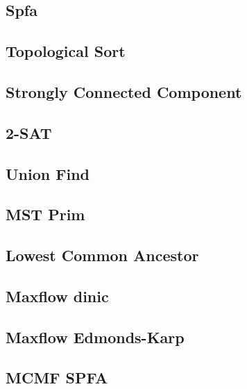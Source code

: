 \documentclass[10pt,landscape,a4paper,twocolumn]{article}
\begin{document}
\subsection{Spfa}


\subsection{Topological Sort}


\subsection{Strongly Connected Component}


\subsection{2-SAT}


\subsection{Union Find}


\subsection{MST Prim}


\subsection{Lowest Common Ancestor}



\subsection{Maxflow dinic}


\subsection{Maxflow Edmonds-Karp}


\subsection{MCMF SPFA}

\end{document}
